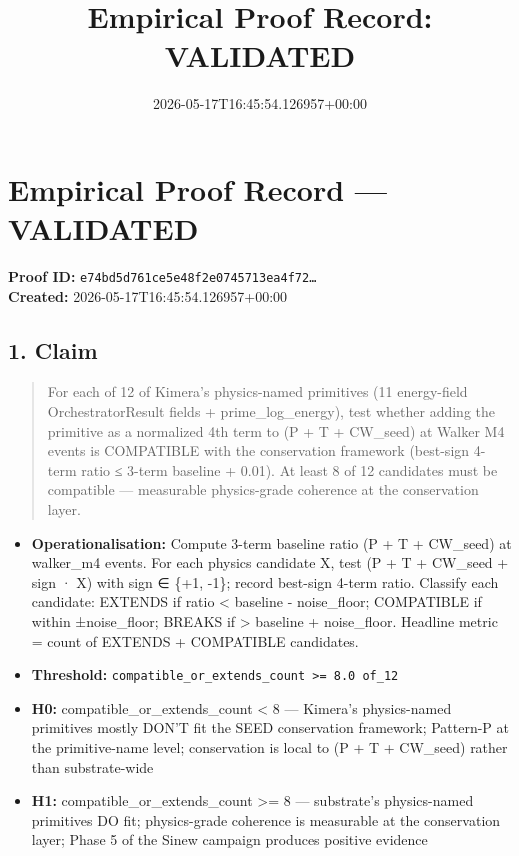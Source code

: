 \documentclass{article}
\title{Empirical Proof Record: VALIDATED}
\date{2026-05-17T16:45:54.126957+00:00}
\begin{document}
\maketitle
\section*{Empirical Proof Record --- \textcolor{validated}{\textbf{VALIDATED}}}
\textbf{Proof ID:} \texttt{e74bd5d761ce5e48f2e0745713ea4f72\dots}\\
\textbf{Created:} 2026-05-17T16:45:54.126957+00:00
\subsection*{1. Claim}
\begin{quote}For each of 12 of Kimera's physics-named primitives (11 energy-field OrchestratorResult fields + prime\_log\_energy), test whether adding the primitive as a normalized 4th term to (P + T + CW\_seed) at Walker M4 events is COMPATIBLE with the conservation framework (best-sign 4-term ratio ≤ 3-term baseline + 0.01). At least 8 of 12 candidates must be compatible — measurable physics-grade coherence at the conservation layer.\end{quote}
\begin{itemize}
\item \textbf{Operationalisation:} Compute 3-term baseline ratio (P + T + CW\_seed) at walker\_m4 events. For each physics candidate X, test (P + T + CW\_seed + sign · X) with sign ∈ \{+1, -1\}; record best-sign 4-term ratio. Classify each candidate: EXTENDS if ratio < baseline - noise\_floor; COMPATIBLE if within ±noise\_floor; BREAKS if > baseline + noise\_floor. Headline metric = count of EXTENDS + COMPATIBLE candidates.
\item \textbf{Threshold:} \texttt{compatible\_or\_extends\_count >= 8.0 of\_12}
\item \textbf{H0:} compatible\_or\_extends\_count < 8 — Kimera's physics-named primitives mostly DON'T fit the SEED conservation framework; Pattern-P at the primitive-name level; conservation is local to (P + T + CW\_seed) rather than substrate-wide
\item \textbf{H1:} compatible\_or\_extends\_count >= 8 — substrate's physics-named primitives DO fit; physics-grade coherence is measurable at the conservation layer; Phase 5 of the Sinew campaign produces positive evidence
\end{itemize}
\end{document}
